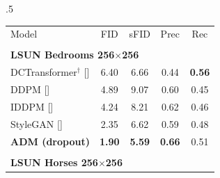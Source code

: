 \documentclass{article}
\newcommand{\shortcite}[1]{[\citenum{#1}]}
\newcommand{\ablaname}{ADM}
\begin{document}
\begin{table}[t]
    \setlength\tabcolsep{4pt}
    \begin{center}
    \begin{small}
    \begin{subtable}[t]{.5\linewidth}
    \begin{tabular}[t]{lcccc}
    \toprule
    Model            & FID          & sFID       & Prec      & Rec \\
    \\
    \multicolumn{5}{l}{\bf{LSUN Bedrooms} 256$\times$256} \\
    \toprule
    
    DCTransformer${}^\dagger$ \shortcite{dctransformer}    & 6.40          & 6.66      & 0.44      & \bf{0.56} \\
    DDPM \shortcite{ddpm} & 4.89 & 9.07 & 0.60 & 0.45 \\
    IDDPM \shortcite{improved}            & 4.24             & 8.21      & 0.62    & 0.46 \\
    StyleGAN \shortcite{stylegan}         & 2.35	         & 6.62      & 0.59      & 0.48 \\
    \bf{\ablaname{} (dropout)}   & \bf{1.90}          & \bf{5.59}      & \bf{0.66}      & 0.51 \\
    
    \\
    \multicolumn{5}{l}{\bf{LSUN Horses} 256$\times$256} \\
    \toprule
    

\end{tabular}
\end{subtable}
\end{small}
\end{center}
\end{table}
\end{document}
